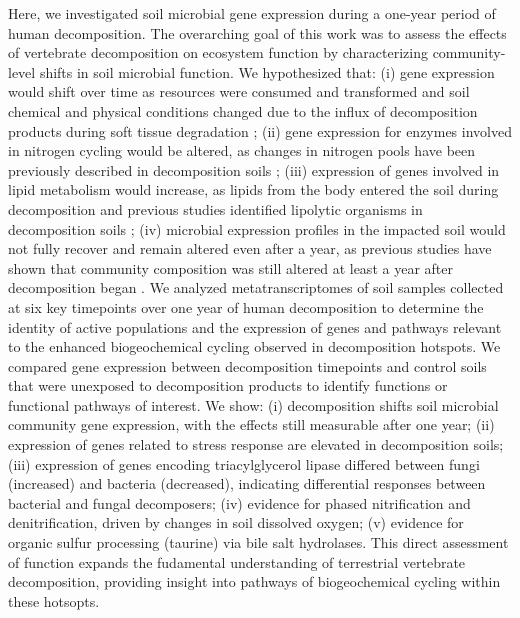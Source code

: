 \documentclass[
  sn-nature,
  lineno, referee]{sn-jnl}
\begin{document}
Here, we investigated soil microbial gene expression during a one-year
period of human decomposition. The overarching goal of this work was to
assess the effects of vertebrate decomposition on ecosystem function by
characterizing community-level shifts in soil microbial function. We
hypothesized that: (i) gene expression would shift over time as
resources were consumed and transformed and soil chemical and physical
conditions changed due to the influx of decomposition products during
soft tissue degradation
\citep{keenan_mortality_2018, fancher_evaluation_2017, debruyn_comparative_2021};
(ii) gene expression for enzymes involved in nitrogen cycling would be
altered, as changes in nitrogen pools have been previously described in
decomposition soils \citep{keenan_mortality_2018}; (iii) expression of
genes involved in lipid metabolism would increase, as lipids from the
body entered the soil during decomposition and previous studies
identified lipolytic organisms in decomposition soils
\citep{howard_characterization_2010, mason_body_2022}; (iv) microbial
expression profiles in the impacted soil would not fully recover and
remain altered even after a year, as previous studies have shown that
community composition was still altered at least a year after
decomposition began
\citep{cobaugh_functional_2015, singh_temporal_2018}. We analyzed
metatranscriptomes of soil samples collected at six key timepoints over
one year of human decomposition to determine the identity of active
populations and the expression of genes and pathways relevant to the
enhanced biogeochemical cycling observed in decomposition hotspots. We
compared gene expression between decomposition timepoints and control
soils that were unexposed to decomposition products to identify
functions or functional pathways of interest. We show: (i) decomposition
shifts soil microbial community gene expression, with the effects still
measurable after one year; (ii) expression of genes related to stress
response are elevated in decomposition soils; (iii) expression of genes
encoding triacylglycerol lipase differed between fungi (increased) and
bacteria (decreased), indicating differential responses between
bacterial and fungal decomposers; (iv) evidence for phased nitrification
and denitrification, driven by changes in soil dissolved oxygen; (v)
evidence for organic sulfur processing (taurine) via bile salt
hydrolases. This direct assessment of function expands the fudamental
understanding of terrestrial vertebrate decomposition, providing insight
into pathways of biogeochemical cycling within these hotsopts.
\end{document}
